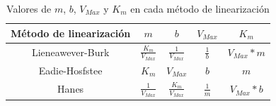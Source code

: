 \begin{table}
\centering
\caption{Valores de $m$, $b$, $V_{Max}$ y $K_{m}$ en cada método de linearización}
\label{tab:valores_métodos_linearización}
\begin{threeparttable}
{
\begin{tabular}{ccccc}\hline

    Método de linearización & \textbf{$m$} & \textbf{$b$} & \textbf{$V_{Max}$} & \textbf{$K_{m}$} \\ \hline
    
    Lieneawever-Burk & $\frac{K_{m}}{V_{Max}}$ & $\frac{1}{V_{Max}}$ & $\frac{1}{b}$ & $V_{Max}*m$ \\
    Eadie-Hosfstee & $K_{m}$ & $V_{Max}$ & $b$ & $m$ \\
    Hanes & $\frac{1}{V_{Max}}$ & $\frac{K_{m}}{V_{Max}}$ & $\frac{1}{m}$ & $V_{Max}*b$ \\
    
    \hline
\end{tabular}
}
\begin{tablenotes} %
    \item[] 
\end{tablenotes}
\end{threeparttable}
\end{table}